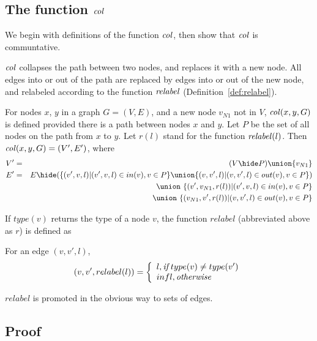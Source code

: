 \subsection{The function $\col$}

We begin with definitions of the function $\col$, then show that $\col$ is communtative. 



$\col$ collapses the path between two nodes, and replaces it with a new node. All edges into or out of the path are replaced by edges into or out of the new node, and  relabeled according to the function $\mathit{relabel}$ (Definition~\ref{def:relabel}).
  
\begin{definition}[$\col$]  \label{def:col}
  For nodes $x$, $y$ in a graph $G = (V,E)$, and a new node $v_{N1}$ not in $V$,  $\mathit{col}(x,y,G)$ is defined provided there is a path between nodes $x$ and $y$. Let $P$ be the set of all nodes on the path from $x$ to $y$. Let $r(l)$ stand for the function $\mathit{relabel}(l)$. Then $\mathit{col}(x,y,G) =  (V',E')$, where 
  \begin{eqnarray*}
  V' & = & (V\hide P) \union \{v_{N1}\}     \\
  E' & = & E\hide (
                   \{(v',v,l)|(v',v,l) \in in(v), v\in P\}
                   \union
                   \{(v,v',l)|(v,v',l) \in out(v), v\in P\}
                  )\\
  && \union\ \{(v',v_{N1},r(l))|(v',v,l) \in in(v), v\in P\}\\
  && \union\ \{(v_{N1},v',r(l))|(v,v',l) \in out(v), v\in P\}\\
  \end{eqnarray*}
\end{definition}
If $type(v)$ returns the type of a node $v$, the function $relabel$ (abbreviated above as $r$) is defined as 
\begin{definition}[$relabel$] \label{def:relabel}
  For an edge $(v,v',l)$, 
  \[
   (v,v',relabel(l)) = \left\{
   \begin{array}{l}
      l,    {\emph{if}}\; type(v) \neq type(v') \\
      infl, \emph{otherwise}
   \end{array}   \right.
  \]
\end{definition}
\noindent
$relabel$ is promoted in the obvious way to sets of edges.

\subsection{Proof}

